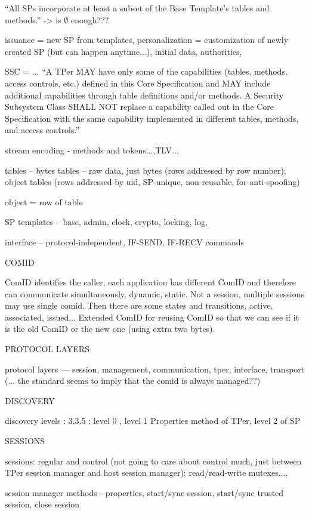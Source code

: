 ``All SPs incorporate at least a subset of the Base Template’s tables and methods.'' -> is $\emptyset$ enough???

issuance = new SP from templates, personalization = customization of newly created SP (but can happen anytime...), initial data, authorities, 

SSC = ... ``A TPer MAY have only some of the capabilities (tables, methods, access controls, etc.) defined in this
Core Specification and MAY include additional capabilities through table definitions and/or methods. A
Security Subsystem Class SHALL NOT replace a capability called out in the Core Specification with the
same capability implemented in different tables, methods, and access controls.''

stream encoding - methods and tokens...,TLV...

tables -- bytes tables -- raw data, just bytes (rows addressed by row number); object tables (rows addressed by uid, SP-unique, non-reusable, for anti-spoofing)

object = row of table

SP templates -- base, admin, clock, crypto, locking, log,


interface -- protocol-independent, IF-SEND, IF-RECV commands 


COMID

ComID identifies the caller, each application has different ComID and therefore can communicate simultaneously, dynamic, static. Not a session, multiple sessions may use single comid. Then there are some states and transitions, active, associated, issued... Extended ComID for reusing ComID so that we can see if it is the old ComID or the new one (using extra two bytes).

PROTOCOL LAYERS

protocol layers --- session, management, communication, tper, interface, transport  
(... the standard seems to imply that the comid is always managed??)

DISCOVERY

discovery levels : 3.3.5 : level 0 , level 1 Properties method of TPer, level 2 of SP

SESSIONS

sessions: regular and control (not going to care about control much, just between TPer session manager and host session manager); read/read-write mutexes..., 

session manager methods - properties, start/sync session, start/sync trusted session, close session

